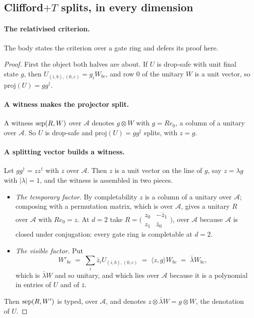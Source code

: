 \documentclass[acmsmall,screen,review,anonymous,nonacm]{acmart}
\begin{document}
\subsection{Clifford\texorpdfstring{$+T$}{+T} splits, in every dimension}\label{app:clifford}

\paragraph{The relativised criterion.} The body states the criterion over
a gate ring and defers its proof here.

\stmtRelativised
\begin{proof}
First the object both halves are about. If $U$ is drop-safe with unit final
state $g$, then $U_{(i,b),(0,c)} = g_i W_{bc}$, and row $0$ of the unitary
$W$ is a unit vector, so $\mathrm{proj}(U) = gg^{\dagger}$.

\paragraph{A witness makes the projector split.} A witness $\mathrm{sep}(R,W)$ over
$\mathcal A$ denotes $g \otimes W$ with $g = Re_0$, a column of a unitary
over $\mathcal A$. So $U$ is drop-safe and $\mathrm{proj}(U) = gg^{\dagger}$
splits, with $z = g$.

\paragraph{A splitting vector builds a witness.} Let $gg^{\dagger} =
zz^{\dagger}$ with $z$ over $\mathcal A$. Then $z$ is a unit vector on the
line of $g$, say $z = \lambda g$ with $|\lambda| = 1$, and the witness is
assembled in two pieces.

\begin{itemize}
\item \emph{The temporary factor.} By completability $z$ is a column of a
  unitary over $\mathcal A$; composing with a permutation matrix, which is
  over $\mathcal A$, gives a unitary $R$ over $\mathcal A$ with $Re_0 = z$.
  At $d = 2$ take $R = \bigl(\begin{smallmatrix} z_0 & -\bar z_1 \\ z_1 &
  \bar z_0 \end{smallmatrix}\bigr)$, over $\mathcal A$ because $\mathcal A$
  is closed under conjugation: every gate ring is completable at $d = 2$.

\item \emph{The visible factor.} Put
  \[
    W'_{bc} \;=\; \sum_i \bar z_i U_{(i,b),(0,c)}
      \;=\; \langle z, g\rangle W_{bc} \;=\; \bar\lambda W_{bc} ,
  \]
  which is $\bar\lambda W$ and so unitary, and which lies over $\mathcal A$
  because it is a polynomial in entries of $U$ and of $\bar z$.
\end{itemize}

Then $\mathrm{sep}(R,W')$ is typed, over $\mathcal A$, and denotes $z \otimes
\bar\lambda W = g \otimes W$, the denotation of $U$.
\end{proof}
\end{document}
